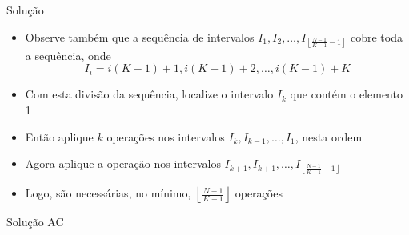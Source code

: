 \begin{frame}[fragile]{Solução}

    \begin{itemize}
        \item Observe também que a sequência de intervalos $I_1, I_2, \ldots, I_{\left\lfloor \frac{N - 1}{K - 1} - 1\right\rfloor}$ cobre toda a sequência, onde
        \[
            I_i = i(K - 1) + 1, i(K - 1) + 2, \ldots, i(K - 1) + K
        \]

        \item Com esta divisão da sequência, localize o intervalo $I_k$ que contém o elemento 1

        \item Então aplique $k$ operações nos intervalos $I_k, I_{k - 1}, \ldots, I_1$, nesta
            ordem

        \item Agora aplique a operação nos intervalos $I_{k + 1}, I_{k + 1}, \ldots, 
            I_{\left\lfloor \frac{N - 1}{K - 1} - 1\right\rfloor}$

        \item Logo, são necessárias, no mínimo, $\left\lfloor \frac{N - 1}{K - 1} \right\rfloor$
            operações
    \end{itemize}

\end{frame}

\begin{frame}[fragile]{Solução AC}
\end{frame}
